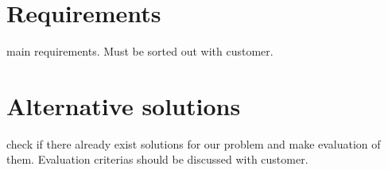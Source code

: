 \section{Requirements}
main requirements. Must be sorted out with customer.

\section{Alternative solutions}
check if there already exist solutions for our problem and make evaluation of them. Evaluation criterias should be discussed with customer. 